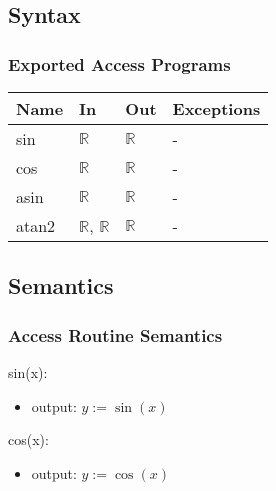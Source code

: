 \documentclass[12pt, titlepage]{article}
\begin{document}
\subsection{Syntax}



\subsubsection{Exported Access Programs}

\begin{center}
\begin{tabular}{p{2cm} p{4cm} p{4cm} p{2cm}}
\hline
\textbf{Name} & \textbf{In} & \textbf{Out} & \textbf{Exceptions} \\
\hline
sin & $\mathbb{R}$ & $\mathbb{R}$ & - \\
cos & $\mathbb{R}$ & $\mathbb{R}$ & - \\
asin & $\mathbb{R}$ & $\mathbb{R}$ & - \\
atan2 & $\mathbb{R}$, $\mathbb{R}$ & $\mathbb{R}$ & - \\
\hline
\end{tabular}
\end{center}

\subsection{Semantics}

\subsubsection{Access Routine Semantics}

\noindent sin(x):
\begin{itemize}
\item output: $y := \sin(x)$
\end{itemize}

\noindent cos(x):
\begin{itemize}
\item output: $y := \cos(x)$
\end{itemize}
\end{document}
